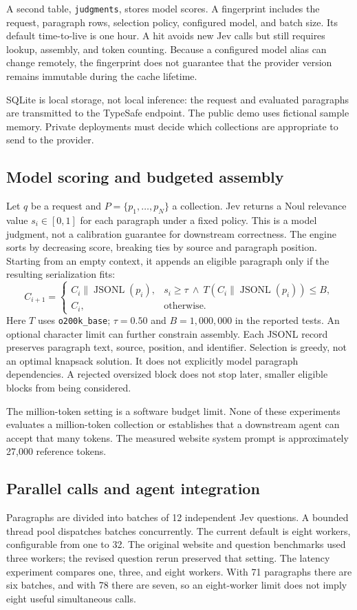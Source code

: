\documentclass[11pt]{article}
\begin{document}
A second table, \texttt{judgments}, stores model scores. A fingerprint includes the request, paragraph rows, selection policy, configured model, and batch size. Its default time-to-live is one hour. A hit avoids new Jev calls but still requires lookup, assembly, and token counting. Because a configured model alias can change remotely, the fingerprint does not guarantee that the provider version remains immutable during the cache lifetime.

SQLite is local storage, not local inference: the request and evaluated paragraphs are transmitted to the TypeSafe endpoint. The public demo uses fictional sample memory. Private deployments must decide which collections are appropriate to send to the provider.

\subsection{Model scoring and budgeted assembly}
Let $q$ be a request and $P=\{p_1,\ldots,p_N\}$ a collection. Jev returns a Noul relevance value $s_i\in[0,1]$ for each paragraph under a fixed policy. This is a model judgment, not a calibration guarantee for downstream correctness. The engine sorts by decreasing score, breaking ties by source and paragraph position. Starting from an empty context, it appends an eligible paragraph only if the resulting serialization fits:
\[
 C_{i+1}=\begin{cases}
 C_i\mathbin{\|}\operatorname{JSONL}(p_i), & s_i\geq\tau\ \land\ T(C_i\mathbin{\|}\operatorname{JSONL}(p_i))\leq B,\\
 C_i, & \text{otherwise}.
 \end{cases}
\]
Here $T$ uses \texttt{o200k\_base}; $\tau=0.50$ and $B=1{,}000{,}000$ in the reported tests. An optional character limit can further constrain assembly. Each JSONL record preserves paragraph text, source, position, and identifier. Selection is greedy, not an optimal knapsack solution. It does not explicitly model paragraph dependencies. A rejected oversized block does not stop later, smaller eligible blocks from being considered.

The million-token setting is a software budget limit. None of these experiments evaluates a million-token collection or establishes that a downstream agent can accept that many tokens. The measured website system prompt is approximately 27,000 reference tokens.

\subsection{Parallel calls and agent integration}
Paragraphs are divided into batches of 12 independent Jev questions. A bounded thread pool dispatches batches concurrently. The current default is eight workers, configurable from one to 32. The original website and question benchmarks used three workers; the revised question rerun preserved that setting. The latency experiment compares one, three, and eight workers. With 71 paragraphs there are six batches, and with 78 there are seven, so an eight-worker limit does not imply eight useful simultaneous calls.
\end{document}
